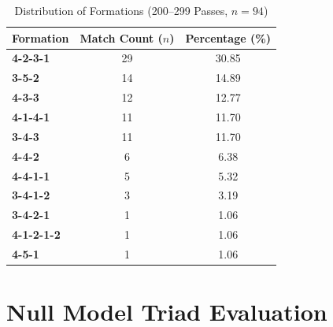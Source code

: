 \documentclass[12pt, a4paper]{article}
\begin{document}
\begin{table}[htbp]
    \centering
    \small
    \caption{Distribution of Formations (200--299 Passes, $n = 94$)}
    \label{tab:formation_binning}
    \begin{tabularx}{0.7\textwidth}{X c c}
        \toprule
        \textbf{Formation} & \textbf{Match Count ($n$)} & \textbf{Percentage (\%)} \\
        \midrule
        \textbf{4-2-3-1} & 29 & 30.85 \\
        \textbf{3-5-2} & 14 & 14.89 \\
        \textbf{4-3-3} & 12 & 12.77 \\
        \textbf{4-1-4-1} & 11 & 11.70 \\
        \textbf{3-4-3} & 11 & 11.70 \\
        \textbf{4-4-2} & 6 & 6.38 \\
        \textbf{4-4-1-1} & 5 & 5.32 \\
        \textbf{3-4-1-2} & 3 & 3.19 \\
        \textbf{3-4-2-1} & 1 & 1.06 \\
        \textbf{4-1-2-1-2} & 1 & 1.06 \\
        \textbf{4-5-1} & 1 & 1.06 \\
        \bottomrule
    \end{tabularx}
\end{table}

\clearpage
\section{Null Model Triad Evaluation}
\label{app:null_triad}
\end{document}
